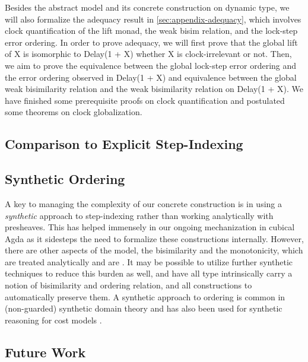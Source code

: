 Besides the abstract model and its concrete construction on dynamic type, 
we will also formalize the adequacy result in \ref{sec:appendix-adequacy}, 
which involves clock quantification of the lift monad, the weak bisim 
relation, and the lock-step error ordering. In order to prove adequacy, 
we will first prove that the global lift of X is isomorphic to Delay(1 + X)
whether X is clock-irrelevant or not. Then, we aim to prove the equivalence 
between the global lock-step error ordering and the error ordering observed 
in Delay(1 + X) and equivalence between the global weak bisimilarity 
relation and the weak bisimilarity relation on Delay(1 + X). We have 
finished some prerequisite proofs on clock quantification and postulated 
some theorems on clock globalization.

\subsection{Comparison to Explicit Step-Indexing}

\subsection{Synthetic Ordering}

A key to managing the complexity of our concrete construction is in
using a \emph{synthetic} approach to step-indexing rather than working
analytically with presheaves. This has helped immensely in our ongoing
mechanization in cubical Agda as it sidesteps the need to formalize
these constructions internally. 
%
However, there are other aspects of the model, the bisimilarity and
the monotonicity, which are treated analytically and are .
%
It may be possible to utilize further synthetic techniques to reduce
this burden as well, and have all type intrinsically carry a notion of
bisimilarity and ordering relation, and all constructions to
automatically preserve them.
%
A synthetic approach to ordering is common in (non-guarded) synthetic
domain theory and has also been used for synthetic reasoning for cost
models \cite{synthetic-domain-theory,decalf}.

\subsection{Future Work}

